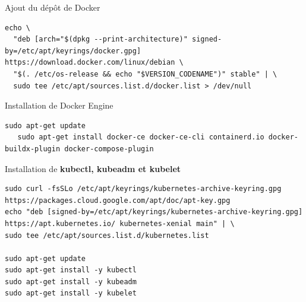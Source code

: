 
\begin{frame}[shrink=7,fragile]{Ajout du dépôt de Docker}

\begin{tiny}
\begin{Verbatim}[commandchars=\&\#\#]
  echo \
  "deb [arch="$(dpkg --print-architecture)" signed-by=/etc/apt/keyrings/docker.gpg] https://download.docker.com/linux/debian \
  "$(. /etc/os-release && echo "$VERSION_CODENAME")" stable" | \
  sudo tee /etc/apt/sources.list.d/docker.list > /dev/null
\end{Verbatim}
\end{tiny}

\end{frame}


\begin{frame}[fragile]{Installation de Docker Engine}

\begin{tiny}
\begin{Verbatim}[commandchars=\&\#\#]
   sudo apt-get update
   sudo apt-get install docker-ce docker-ce-cli containerd.io docker-buildx-plugin docker-compose-plugin
\end{Verbatim}
\end{tiny}

\end{frame}


\begin{frame}[shrink=7,fragile]{Installation de \textbf{kubectl, kubeadm et kubelet}}

\begin{tiny}
\begin{Verbatim}[commandchars=\&\#\#]
sudo curl -fsSLo /etc/apt/keyrings/kubernetes-archive-keyring.gpg https://packages.cloud.google.com/apt/doc/apt-key.gpg
echo "deb [signed-by=/etc/apt/keyrings/kubernetes-archive-keyring.gpg] https://apt.kubernetes.io/ kubernetes-xenial main" | \
sudo tee /etc/apt/sources.list.d/kubernetes.list

sudo apt-get update
sudo apt-get install -y kubectl
sudo apt-get install -y kubeadm
sudo apt-get install -y kubelet
\end{Verbatim}
\end{tiny}

\end{frame}

